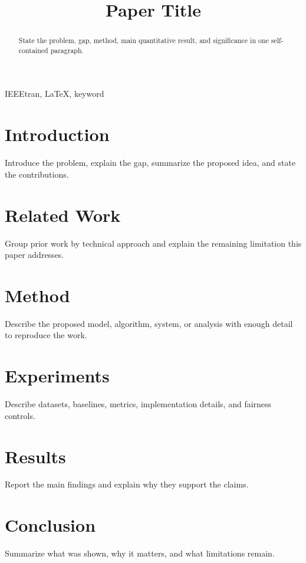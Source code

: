 \documentclass[conference]{IEEEtran}
\begin{document}
\title{Paper Title}

\author{
\and
{}
}

\maketitle

\begin{abstract}
State the problem, gap, method, main quantitative result, and significance in one self-contained paragraph.
\end{abstract}

\begin{IEEEkeywords}
IEEEtran, LaTeX, keyword
\end{IEEEkeywords}

\section{Introduction}
Introduce the problem, explain the gap, summarize the proposed idea, and state the contributions.

\section{Related Work}
Group prior work by technical approach and explain the remaining limitation this paper addresses.

\section{Method}
Describe the proposed model, algorithm, system, or analysis with enough detail to reproduce the work.

\section{Experiments}
Describe datasets, baselines, metrics, implementation details, and fairness controls.

\section{Results}
Report the main findings and explain why they support the claims.

\section{Conclusion}
Summarize what was shown, why it matters, and what limitations remain.



\end{document}
